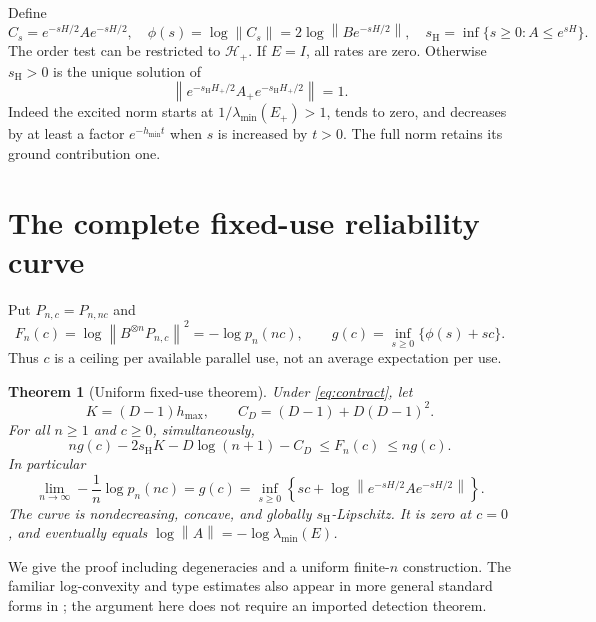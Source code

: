 \documentclass[11pt,a4paper]{article}
\newtheorem{theorem}{Theorem}[section]
\theoremstyle{remark}
\newcommand{\norm}[1]{\left\|#1\right\|}
\newcommand{\ep}{E_+}
\newcommand{\hp}{H_+}
\newcommand{\sh}{s_{\mathrm H}}
\begin{document}
Define
\begin{equation}\label{eq:tilts}
 C_s=e^{-sH/2}Ae^{-sH/2},\quad
 \phi(s)=\log\norm{C_s}=2\log\norm{Be^{-sH/2}},\quad
 \sh=\inf\{s\geq0:A\leq e^{sH}\}.
\end{equation}
The order test can be restricted to \(\mathcal H_+\).
If \(E=I\), all rates are zero. Otherwise \(\sh>0\) is the unique solution
of
\begin{equation}\label{eq:root}
 \norm{e^{-\sh\hp/2}A_+e^{-\sh\hp/2}}=1.
\end{equation}
Indeed the excited norm starts at \(1/\lambda_{\min}(\ep)>1\), tends to
zero, and decreases by at least a factor \(e^{-h_{\min}t}\) when \(s\)
is increased by \(t>0\). The full norm retains its ground contribution one.

\section{The complete fixed-use reliability curve}
Put \(P_{n,c}=P_{n,nc}\) and
\[
 F_n(c)=\log\norm{B^{\otimes n}P_{n,c}}^2=-\log p_n(nc),\qquad
 g(c)=\inf_{s\geq0}\{\phi(s)+sc\}.
\]
Thus \(c\) is a ceiling per available parallel use, not an average
expectation per use.

\begin{theorem}[Uniform fixed-use theorem]\label{thm:fixed}
Under \eqref{eq:contract}, let
\[
 K=(D-1)h_{\max},\qquad C_D=(D-1)+D(D-1)^2.
\]
For all \(n\geq1\) and \(c\geq0\), simultaneously,
\begin{equation}\label{eq:uniform}
 ng(c)-2\sh K-D\log(n+1)-C_D
 \ \leq F_n(c)\ \leq ng(c).
\end{equation}
In particular
\[
 \lim_{n\to\infty}-\frac1n\log p_n(nc)=g(c)
 =\inf_{s\geq0}\left\{sc+
   \log\norm{e^{-sH/2}Ae^{-sH/2}}\right\}.
\]
The curve is nondecreasing, concave, and globally \(\sh\)-Lipschitz.
It is zero at \(c=0\), and eventually equals
\(\log\norm A=-\log\lambda_{\min}(E)\).
\end{theorem}

We give the proof including degeneracies and a uniform finite-\(n\)
construction. The familiar log-convexity and type estimates also appear in
more general standard forms in \cite{BourinLee,CsiszarShields}; the argument
here does not require an imported detection theorem.
\end{document}

